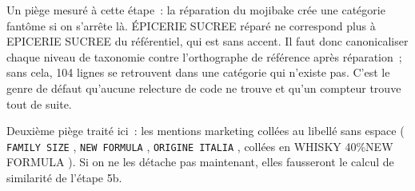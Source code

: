 \documentclass[11pt,a4paper]{article}
\begin{document}
Un piège mesuré à cette étape~: la réparation du mojibake crée une catégorie fantôme si on
s'arrête là. \guillemotleft{} ÉPICERIE SUCREE \guillemotright{} réparé ne correspond plus à \guillemotleft{} EPICERIE SUCREE \guillemotright{} du référentiel,
qui est sans accent. Il faut donc canonicaliser chaque niveau de taxonomie contre l'orthographe de
référence après réparation~; sans cela, 104 lignes se retrouvent dans une catégorie qui n'existe
pas. C'est le genre de défaut qu'aucune relecture de code ne trouve et qu'un compteur trouve tout
de suite.

Deuxième piège traité ici~: les mentions marketing collées au libellé sans espace
(\guillemotleft{} \texttt{FAMILY SIZE} \guillemotright{}, \guillemotleft{} \texttt{NEW FORMULA} \guillemotright{}, \guillemotleft{} \texttt{ORIGINE ITALIA} \guillemotright{}, collées en
\guillemotleft{} WHISKY 40\%NEW FORMULA \guillemotright{}). Si on ne les détache pas maintenant, elles fausseront le calcul de
similarité de l'étape 5b.
\end{document}
